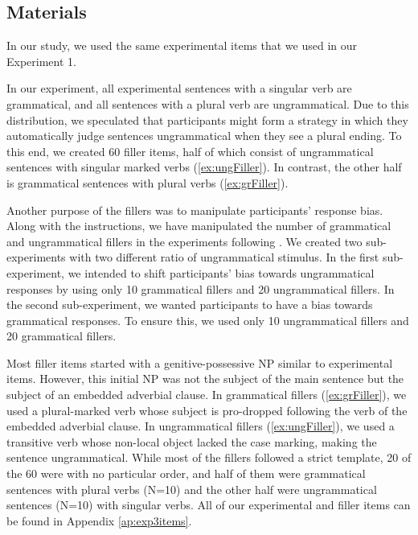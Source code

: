 \subsection{Materials}

In our study, we used the same experimental items that we used in our Experiment 1. 


In our experiment, all experimental sentences with a singular verb are grammatical, and all sentences with a plural verb are ungrammatical. Due to this distribution, we speculated that participants might form a strategy in which they automatically judge sentences ungrammatical when they see a plural ending. To this end, we created 60 filler items, half of which consist of ungrammatical sentences with singular marked verbs (\ref{ex:ungFiller}). In contrast, the other half is grammatical sentences with plural verbs (\ref{ex:grFiller}). 

Another purpose of the fillers was to manipulate participants' response bias. Along with the instructions, we have manipulated the number of grammatical and ungrammatical fillers in the experiments following . We created two sub-experiments with two different ratio of ungrammatical stimulus. In the first sub-experiment, we intended to shift participants' bias towards ungrammatical responses by using only 10 grammatical fillers and 20 ungrammatical fillers. In the second sub-experiment, we wanted participants to have a bias towards grammatical responses. To ensure this, we used only 10 ungrammatical fillers and 20 grammatical fillers.

Most filler items started with a genitive-possessive NP similar to experimental items. However, this initial NP was not the subject of the main sentence but the subject of an embedded adverbial clause. In grammatical fillers (\ref{ex:grFiller}), we used a plural-marked verb whose subject is pro-dropped following the verb of the embedded adverbial clause. In ungrammatical fillers (\ref{ex:ungFiller}), we used a transitive verb whose non-local object lacked the case marking, making the sentence ungrammatical. While most of the fillers followed a strict template, 20 of the 60 were with no particular order, and half of them were grammatical sentences  with plural verbs (N=10) and the other half were ungrammatical sentences (N=10) with singular verbs. All of our experimental and filler items can be found in Appendix \ref{ap:exp3items}.


